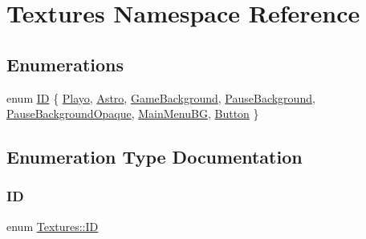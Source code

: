 \hypertarget{namespace_textures}{}\section{Textures Namespace Reference}
\label{namespace_textures}
\subsection*{Enumerations}
\begin{DoxyCompactItemize}
\item 
enum \hyperlink{namespace_textures_a2cfe2099537d4e80b08437b4978301a5}{ID} \{ \newline
\hyperlink{namespace_textures_a2cfe2099537d4e80b08437b4978301a5aa7eca1b35d39c70635eb67e8d21dc819}{Playo}, 
\hyperlink{namespace_textures_a2cfe2099537d4e80b08437b4978301a5a61cbf1132258cda586a6130a03e804c9}{Astro}, 
\hyperlink{namespace_textures_a2cfe2099537d4e80b08437b4978301a5a52aa97e3cdb226168982426b7ab0aa2d}{Game\+Background}, 
\hyperlink{namespace_textures_a2cfe2099537d4e80b08437b4978301a5aa39a5e3bca9832daaaa9cbf31b8961f9}{Pause\+Background}, 
\newline
\hyperlink{namespace_textures_a2cfe2099537d4e80b08437b4978301a5a7b0d808a2186b3245e46459706c4bb7f}{Pause\+Background\+Opaque}, 
\hyperlink{namespace_textures_a2cfe2099537d4e80b08437b4978301a5aa7d0eb38e6c55469c163efe01cb88695}{Main\+Menu\+BG}, 
\hyperlink{namespace_textures_a2cfe2099537d4e80b08437b4978301a5ac583013e9c40cfacce00147270928966}{Button}
 \}
\end{DoxyCompactItemize}


\subsection{Enumeration Type Documentation}
\hypertarget{namespace_textures_a2cfe2099537d4e80b08437b4978301a5}{}\label{namespace_textures_a2cfe2099537d4e80b08437b4978301a5} 
\subsubsection{\texorpdfstring{ID}{ID}}
{\footnotesize\ttfamily enum \hyperlink{namespace_textures_a2cfe2099537d4e80b08437b4978301a5}{Textures\+::\+ID}}

